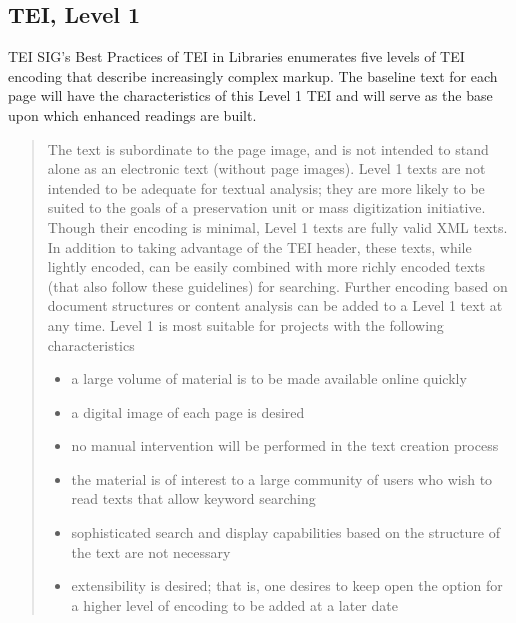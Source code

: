 \subsection{TEI, Level 1}
TEI SIG's Best Practices of TEI in Libraries enumerates five levels of TEI encoding that describe increasingly complex markup. The baseline text for each page will have the characteristics of this Level 1 TEI and will serve as the base upon which enhanced readings are built.
\begin{quote}
\begin{singlespace}
The text is subordinate to the page image, and is not intended to stand alone as an electronic text (without page images). Level 1 texts are not intended to be adequate for textual analysis; they are more likely to be suited to the goals of a preservation unit or mass digitization initiative. Though their encoding is minimal, Level 1 texts are fully valid XML texts. In addition to taking advantage of the TEI header, these texts, while lightly encoded, can be easily combined with more richly encoded texts (that also follow these guidelines) for searching. Further encoding based on document structures or content analysis can be added to a Level 1 text at any time.
Level 1 is most suitable for projects with the following characteristics
\begin{itemize}
    \item{a large volume of material is to be made available online quickly}
    \item{a digital image of each page is desired}
    \item{no manual intervention will be performed in the text creation process}
    \item{the material is of interest to a large community of users who wish to read texts that allow keyword searching}
    \item{sophisticated search and display capabilities based on the structure of the text are not necessary}
    \item{extensibility is desired; that is, one desires to keep open the option for a higher level of encoding to be added at a later date}
\end{itemize}
\cite{tei_sig_on_libraries_best_2011}
\end{singlespace}
\end{quote}
